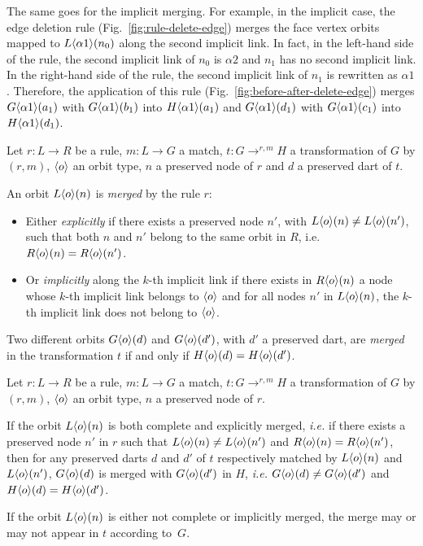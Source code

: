 The same goes for the implicit merging.
For example, in the implicit case, the edge deletion rule (Fig.~\ref{fig:rule-delete-edge}) merges the face vertex orbits mapped to $L\langle\alpha 1\rangle(n_{0})$ along the second implicit link.
In fact, in the left-hand side of the rule, the second implicit link of $n_0$ is $\alpha 2$ %
and $n_1$ has no second implicit link.
In the right-hand side of the rule, the second implicit link of $n_{1}$ is rewritten as $\alpha 1$.
Therefore, the application of this rule (Fig.~\ref{fig:before-after-delete-edge}) merges $G\langle\alpha 1\rangle(a_{1})$ with $G\langle\alpha 1\rangle(b_{1})$ into $H\langle\alpha 1\rangle(a_{1})$ and $G\langle\alpha 1\rangle(d_{1})$ with $G\langle\alpha 1\rangle(c_{1})$ into $H\langle\alpha 1\rangle(d_{1})$.


\begin{definition}
    Let $r : L \longrightarrow R$ be a rule, $m : L \to G$ a match, $t : G \longrightarrow^{r,m} H$ a transformation of $G$ by $(r,m)$, $\langle o\rangle$ an orbit type, $n$ a preserved node of $r$ and $d$ a preserved dart of $t$.

    An orbit $L\langle o\rangle(n)$ is \emph{merged} by the rule $r$:
    \begin{itemize}
        \item Either \emph{explicitly} if there exists a preserved node $n'$, with $L\langle o\rangle(n) \neq L\langle o\rangle(n')$, such that both $n$ and $n'$ belong to the same orbit in $R$, i.e. $R\langle o\rangle(n) = R\langle o\rangle(n')$.

        \item Or \emph{implicitly} along the $k$-th implicit link if there exists in $R\langle o\rangle(n)$ a node whose $k$-th implicit link belongs to $\langle o\rangle$ and for all nodes $n'$ in $L\langle o\rangle(n)$, the $k$-th implicit link does not belong to $\langle o\rangle$.
    \end{itemize}

    Two different orbits $G\langle o\rangle(d)$ and $G\langle o\rangle(d')$, with $d'$ a preserved dart, are \emph{merged} in the transformation $t$ if and only if $H\langle o\rangle(d) = H\langle o\rangle(d')$.
\end{definition}

\begin{proposition}%
   Let $r : L \longrightarrow R$ be a rule, $m : L \to G$ a match,
  $t : G \longrightarrow^{r,m} H$ a transformation of $G$ by $(r,m)$,
  $\langle o\rangle$ an orbit type, $n$ a preserved node of $r$.

  If the orbit $L\langle o\rangle(n)$ is both complete and explicitly merged, \textit{i.e.} if there exists a preserved node $n'$ in $r$ such that $L\langle o\rangle(n) \neq L\langle o\rangle(n')$ and $R\langle o\rangle(n) = R\langle o\rangle(n')$, then for any preserved darts $d$ and $d'$ of $t$ respectively matched by $L\langle o\rangle(n)$ and $L\langle o\rangle(n')$, $G\langle o\rangle(d)$ is merged with $G\langle o\rangle(d')$ in $H$, \textit{i.e.} $G\langle o\rangle(d) \neq G\langle o\rangle(d')$ and $H\langle o\rangle(d) = H\langle o\rangle(d')$.

  If the orbit $L\langle o\rangle(n)$ is either not complete or implicitly merged, the merge may or may not appear in $t$ according to~$G$.
\end{proposition}

